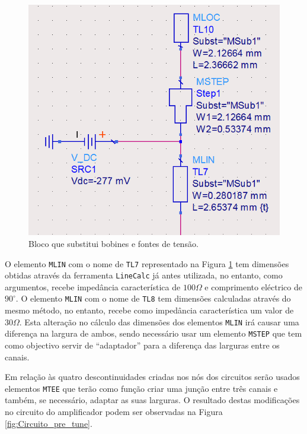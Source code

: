 \documentclass[11pt]{article}
\numberwithin{equation}{section}
\begin{document}
\begin{figure}[H]
	\centering
	\includegraphics[keepaspectratio=true, scale=0.45]{exps/bobine}
	\vspace{-0.5em}
	\caption{Bloco que substitui bobines e fontes de tensão.}
	\vspace{-0.8em}
	\label{fig:bobine}
\end{figure}

O elemento \texttt{MLIN} com o nome de \texttt{TL7} representado na Figura \ref{fig:bobine} tem dimensões obtidas através da ferramenta \texttt{LineCalc} já antes utilizada, no entanto, como argumentos, recebe impedância característica de $100 \Omega$ e comprimento eléctrico de $90^{\circ}$. O elemento \texttt{MLIN} com o nome de \texttt{TL8} tem dimensões calculadas através do mesmo método, no entanto, recebe como impedância característica um valor de $30 \Omega$. Esta alteração no cálculo das dimensões dos elementos \texttt{MLIN} irá causar uma diferença na largura de ambos, sendo necessário usar um elemento \texttt{MSTEP} que tem como objectivo servir de ``adaptador'' para a diferença das larguras entre os canais.

Em relação às quatro descontinuidades criadas nos nós dos circuitos serão usados elementos \texttt{MTEE} que terão como função criar uma junção entre três canais e também, se necessário, adaptar as suas larguras. O resultado destas modificações no circuito do amplificador podem ser observadas na Figura \ref{fig:Circuito_pre_tune}.
\end{document}
